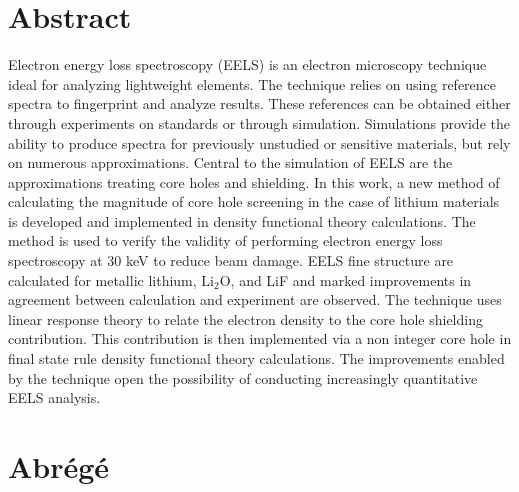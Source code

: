 \documentclass[12pt]{report}
\begin{document}



\renewcommand{\thepage}{\roman{page}}%
 
\tableofcontents





\chapter*{Abstract}



Electron energy loss spectroscopy (EELS) is an electron microscopy technique ideal for analyzing lightweight elements. The technique relies on using reference spectra to fingerprint and analyze results. These references can be obtained either through experiments  on standards or through simulation.  Simulations provide the ability to produce spectra for previously unstudied or sensitive materials, but rely on numerous approximations. Central to the simulation of EELS are the approximations treating core holes and shielding.  In this work, a new method of calculating the magnitude of core hole screening in the case of lithium materials is developed and implemented in density functional theory calculations. The method is used to verify the validity of performing electron energy loss spectroscopy at 30 keV to reduce beam damage.  EELS fine structure are calculated for metallic lithium, $\mathrm{Li_2O}$, and LiF and marked improvements in agreement between calculation and experiment are observed. The technique uses linear response theory to relate the electron density to the core hole shielding contribution.  This contribution is then implemented via a non integer core hole in final state rule density functional theory calculations.  The improvements enabled by the technique open the possibility of conducting increasingly quantitative EELS analysis.
\\

\chapter*{Abr\'eg\'e}

\end{document}
